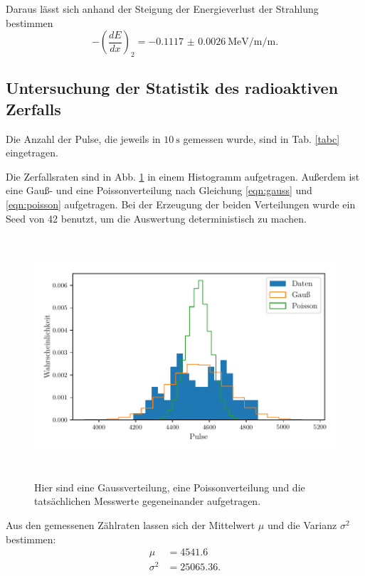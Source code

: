 \noindent Daraus lässt sich anhand der Steigung der Energieverlust der Strahlung bestimmen %
\begin{equation*}
    - \left( \frac{dE}{dx} \right)_2 = - \SI{0.1117(26)}{\mega\electronvolt\per\milli\per\meter}.
\end{equation*}

\subsection{Untersuchung der Statistik des radioaktiven Zerfalls}

Die Anzahl der Pulse, die jeweils in $\SI{10}{\second}$ gemessen wurde, sind in Tab. \ref{tabc} eingetragen.



\noindent Die Zerfallsraten sind in Abb. \ref{fig:histogramm} in einem Histogramm aufgetragen. Außerdem ist eine Gauß- und eine Poissonverteilung nach Gleichung \eqref{eqn:gauss} und \eqref{eqn:poisson} aufgetragen. Bei der Erzeugung der beiden Verteilungen wurde ein Seed von 42 benutzt, um die Auswertung deterministisch zu machen. 
\begin{figure}
    \centering
    \includegraphics[width=15cm, height=9cm]{build/plote.pdf}
    \caption{Hier sind eine Gaussverteilung, eine Poissonverteilung und die tatsächlichen Messwerte gegeneinander aufgetragen.}
    \label{fig:histogramm}
\end{figure}

\noindent Aus den gemessenen Zählraten lassen sich der  Mittelwert $\mu$ und die Varianz $\sigma^2$ bestimmen: %
\begin{align*}
    \mu &= \num{4541.6} \\
    \sigma^2 &= \num{25065.36}.
\end{align*}

